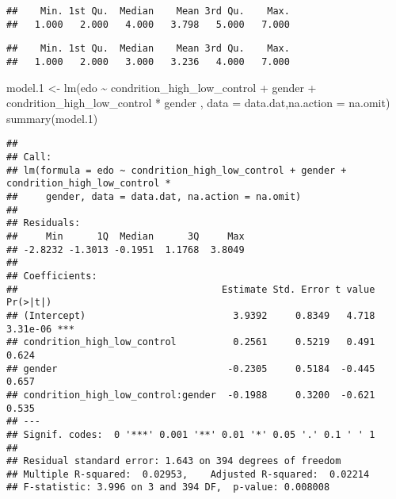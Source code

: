 \documentclass[
]{article}
\newenvironment{Shaded}{\begin{snugshade}}{\end{snugshade}}
\newcommand{\AttributeTok}[1]{\textcolor[rgb]{0.77,0.63,0.00}{#1}}
\newcommand{\FloatTok}[1]{\textcolor[rgb]{0.00,0.00,0.81}{#1}}
\newcommand{\FunctionTok}[1]{\textcolor[rgb]{0.00,0.00,0.00}{#1}}
\newcommand{\NormalTok}[1]{#1}
\newcommand{\OtherTok}[1]{\textcolor[rgb]{0.56,0.35,0.01}{#1}}
\newcommand{\SpecialCharTok}[1]{\textcolor[rgb]{0.00,0.00,0.00}{#1}}
\begin{document}
\begin{verbatim}
##    Min. 1st Qu.  Median    Mean 3rd Qu.    Max. 
##   1.000   2.000   4.000   3.798   5.000   7.000
\end{verbatim}

\begin{Shaded}
\end{Shaded}

\begin{verbatim}
##    Min. 1st Qu.  Median    Mean 3rd Qu.    Max. 
##   1.000   2.000   3.000   3.236   4.000   7.000
\end{verbatim}

\begin{Shaded}
\begin{Highlighting}[]
\NormalTok{model}\FloatTok{.1} \OtherTok{\textless{}{-}} \FunctionTok{lm}\NormalTok{(edo }\SpecialCharTok{\textasciitilde{}}\NormalTok{ condrition\_high\_low\_control }\SpecialCharTok{+}\NormalTok{ gender }\SpecialCharTok{+}\NormalTok{ condrition\_high\_low\_control }\SpecialCharTok{*}\NormalTok{ gender}
\NormalTok{              , }\AttributeTok{data =}\NormalTok{ data.dat,}\AttributeTok{na.action =}\NormalTok{ na.omit)}
\FunctionTok{summary}\NormalTok{(model}\FloatTok{.1}\NormalTok{)}
\end{Highlighting}
\end{Shaded}

\begin{verbatim}
## 
## Call:
## lm(formula = edo ~ condrition_high_low_control + gender + condrition_high_low_control * 
##     gender, data = data.dat, na.action = na.omit)
## 
## Residuals:
##     Min      1Q  Median      3Q     Max 
## -2.8232 -1.3013 -0.1951  1.1768  3.8049 
## 
## Coefficients:
##                                    Estimate Std. Error t value Pr(>|t|)    
## (Intercept)                          3.9392     0.8349   4.718 3.31e-06 ***
## condrition_high_low_control          0.2561     0.5219   0.491    0.624    
## gender                              -0.2305     0.5184  -0.445    0.657    
## condrition_high_low_control:gender  -0.1988     0.3200  -0.621    0.535    
## ---
## Signif. codes:  0 '***' 0.001 '**' 0.01 '*' 0.05 '.' 0.1 ' ' 1
## 
## Residual standard error: 1.643 on 394 degrees of freedom
## Multiple R-squared:  0.02953,    Adjusted R-squared:  0.02214 
## F-statistic: 3.996 on 3 and 394 DF,  p-value: 0.008008
\end{verbatim}
\end{document}
